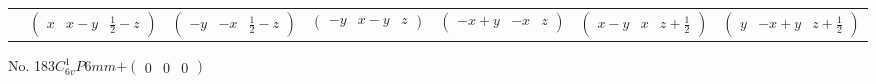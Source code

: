 \documentclass[fleqn,9pt,landscape]{jsarticle}
\begin{document}
\begin{center}
\begin{longtable}{ccccccc}
& $ \begin{pmatrix} x & x - y & \frac{1}{2} - z \end{pmatrix} $ & $ \begin{pmatrix} - y & - x & \frac{1}{2} - z \end{pmatrix} $ & $ \begin{pmatrix} - y & x - y & z \end{pmatrix} $ & $ \begin{pmatrix} - x + y & - x & z \end{pmatrix} $ & $ \begin{pmatrix} x - y & x & z + \frac{1}{2} \end{pmatrix} $ & $ \begin{pmatrix} y & - x + y & z + \frac{1}{2} \end{pmatrix} $ \\
\end{longtable}
\end{center}
\newpage
No. 183\quad$C_{6v}^{1}$\quad$P6mm$\quad[ hexagonal ]\quad$+\begin{pmatrix} 0 & 0 & 0 \end{pmatrix}$
\end{document}
